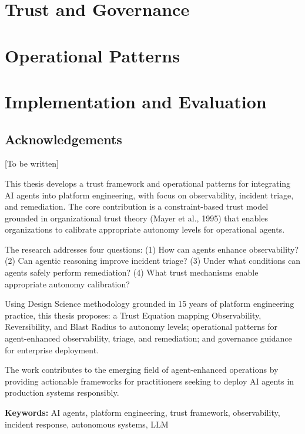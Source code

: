 \documentclass{TTUPhD}
\begin{document}
\part{Trust and Governance}




\part{Operational Patterns}




\part{Implementation and Evaluation}




\backmatter

\chapter*{Acknowledgements}

[To be written]




\begin{abstracten}
This thesis develops a trust framework and operational patterns for integrating AI agents into platform engineering, with focus on observability, incident triage, and remediation. The core contribution is a constraint-based trust model grounded in organizational trust theory (Mayer et al., 1995) that enables organizations to calibrate appropriate autonomy levels for operational agents.

The research addresses four questions: (1) How can agents enhance observability? (2) Can agentic reasoning improve incident triage? (3) Under what conditions can agents safely perform remediation? (4) What trust mechanisms enable appropriate autonomy calibration?

Using Design Science methodology grounded in 15 years of platform engineering practice, this thesis proposes: a Trust Equation mapping Observability, Reversibility, and Blast Radius to autonomy levels; operational patterns for agent-enhanced observability, triage, and remediation; and governance guidance for enterprise deployment.

The work contributes to the emerging field of agent-enhanced operations by providing actionable frameworks for practitioners seeking to deploy AI agents in production systems responsibly.

\textbf{Keywords:} AI agents, platform engineering, trust framework, observability, incident response, autonomous systems, LLM
\end{abstracten}
\end{document}
